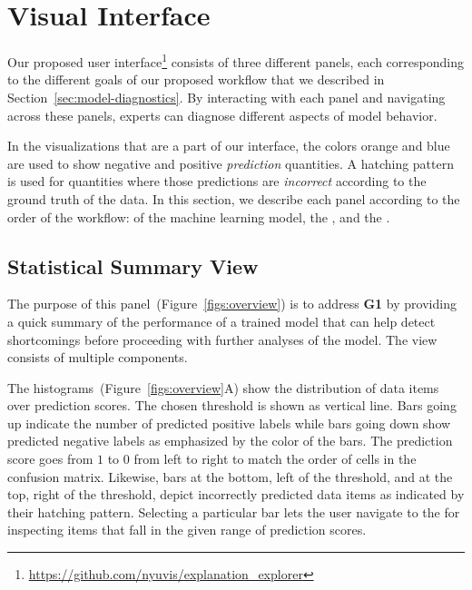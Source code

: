 



\section{Visual Interface}
\label{sec:ui}
Our proposed user interface\footnote{\href{https://github.com/nyuvis/explanation_explorer}{https://github.com/nyuvis/explanation\_explorer}} consists of three different panels, each corresponding to the different goals of our proposed workflow that we described in Section~\ref{sec:model-diagnostics}. By interacting with each panel and navigating across these panels, experts can diagnose different aspects of model behavior.

In the visualizations that are a part of our interface, 
the colors orange and blue are used to show negative and positive \textit{prediction} quantities.
A hatching pattern is used for quantities where those predictions are \textit{incorrect} according to the ground truth of the data.
In this section, we describe each panel according to the order of the workflow: \tabA of the machine learning model, the \tabB, and the \tabC.

\subsection{Statistical Summary View}

The purpose of this panel~(Figure~\ref{figs:overview}) is to address \textbf{G1} by providing a quick summary of the performance of a trained model that can help detect shortcomings before proceeding with further analyses of the model. 
The view consists of multiple components.

The histograms~(Figure~\ref{figs:overview}A) show the distribution of data items over prediction scores.
The chosen threshold is shown as vertical line.
Bars going up indicate the number of predicted positive labels while bars going down show predicted negative labels as emphasized by the color of the bars.
The prediction score goes from $1$ to $0$ from left to right to match the order of cells in the confusion matrix.
Likewise, bars at the bottom, left of the threshold, and at the top, right of the threshold, depict incorrectly predicted data items as indicated by their hatching pattern.
Selecting a particular bar lets the user navigate to the \tabB for inspecting items that fall in the given range of prediction scores.


